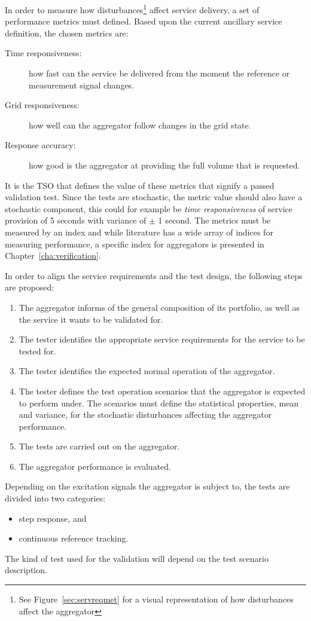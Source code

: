 In order to measure how disturbances\footnote{See Figure~\ref{sec:servreqmet} for a visual representation of how disturbances affect the aggregator} affect service delivery, a set of performance metrics must defined. Based upon the current ancillary service definition, the chosen metrics are:
\begin{description}
	\item[Time responsiveness:] how fast can the service be delivered from the moment the reference or measurement signal changes.
	\item[Grid responsiveness:] how well can the aggregator follow changes in the grid state.
	\item[Response accuracy:] how good is the aggregator at providing the full volume that is requested.
\end{description}

It is the TSO that defines the value of these metrics that signify a passed validation test. Since the tests are stochastic, the metric value should also have a stochastic component, this could for example be \emph{time responsiveness} of service provision of 5 seconds with variance of $\pm$ 1 second. The metrics must be measured by an index and while literature has a wide array of indices for measuring performance, a specific index for aggregators is presented in Chapter~\ref{cha:verification}.

In order to align the service requirements and the test design, the following steps are proposed:
\begin{enumerate}
	\item The aggregator informs of the general composition of its portfolio, as well as the service it wants to be validated for.
	\item The tester identifies the appropriate service requirements for the service to be tested for.
	\item The tester identifies the expected normal operation of the aggregator.
	\item The tester defines the test operation scenarios that the aggregator is expected to perform under. The scenarios must define the statistical properties, \eg mean and variance, for the stochastic disturbances affecting the aggregator performance.
	\item The tests are carried out on the aggregator.
	\item The aggregator performance is evaluated.	
\end{enumerate}

Depending on the excitation signals the aggregator is subject to, the tests are divided into two categories:
\begin{itemize}
	\item step response, and
	\item continuous reference tracking.
\end{itemize}
The kind of test used for the validation will depend on the test scenario description.

